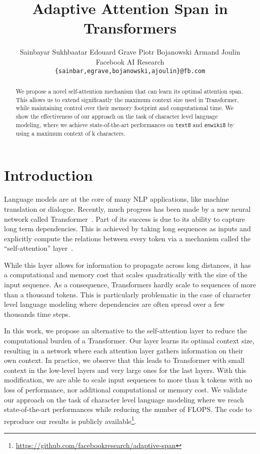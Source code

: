 \documentclass[11pt,a4paper]{article}
\title{Adaptive Attention Span in Transformers}
\author{
Sainbayar Sukhbaatar \quad Edouard Grave \quad Piotr Bojanowski \quad Armand Joulin \\
  Facebook AI Research\\
  \texttt{\{sainbar,egrave,bojanowski,ajoulin\}@fb.com} \\
}
\date{}
\begin{document}
\maketitle

\begin{abstract}
We propose a novel self-attention mechanism that can learn its optimal attention span.
This allows us to extend significantly the maximum context size used in Transformer,
while maintaining control over their memory footprint and computational time.
We show the effectiveness of our approach on the task of character level language modeling, where we achieve state-of-the-art performances on \texttt{text8} and \texttt{enwiki8} by using a maximum context of k characters.
\end{abstract}

\section{Introduction}

Language models are at the core of many NLP applications, like machine translation or dialogue.
Recently, much progress has been made by a new neural network called Transformer~\citep{vaswani2017attention}.
Part of its success is due to its ability to capture long term dependencies.
This is achieved by taking long sequences as inputs and explicitly compute the relations between every token via a mechanism called the ``self-attention'' layer~\citep{al2018character}.

While this layer allows for information to propagate across long distances, it has a computational and memory cost that scales quadratically with the size of the input sequence.
As a consequence, Transformers hardly scale to sequences of more than a thousand  tokens.
This is particularly problematic in the case of character level language modeling  where dependencies are often spread over a few thousands time steps.

In this work, we propose an alternative to the self-attention layer to reduce the computational burden of a Transformer.
Our layer learns its optimal context size, resulting in a network where each attention layer gathers information on their own context.
In practice, we observe that this leads to  Transformer with small context in the low-level layers and very large ones for the last layers.
With this modification, we are able to scale input sequences to more than k tokens with no loss of performance, nor additional computational or memory cost.
We validate our approach on the task of character level language modeling where we reach state-of-the-art performances while reducing the number of FLOPS.
The code to reproduce our results is publicly available\footnote{\url{https://github.com/facebookresearch/adaptive-span}}.
 
\end{document}
